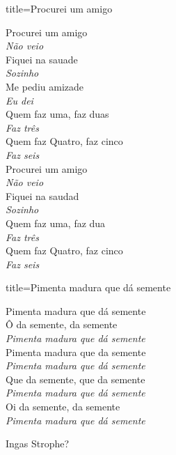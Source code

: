 \documentclass[fontsize=14pt, twoside]{scrreprt}
\begin{document}
\begin{multicols*}{2}
\begin{song}{title={Procurei um amigo }}
        \begin{verse*}
            Procurei um amigo\\
            \textit{Não veio}\\
            Fiquei na sauade\\
            \textit{Sozinho}\\
            Me pediu amizade\\
            \textit{Eu dei}\\
            Quem faz uma, faz duas\\
            \textit{Faz três}\\
            Quem faz Quatro, faz cinco\\
            \textit{Faz seis}\\
            Procurei um amigo\\
            \textit{Não veio}\\
            Fiquei na saudad\\
            \textit{Sozinho}\\
            Quem faz uma, faz dua\\
            \textit{Faz três}\\
            Quem faz Quatro, faz cinco\\
            \textit{Faz seis}\\
        \end{verse*}
\end{song}
\columnbreak
\begin{song}{title={Pimenta madura que dá semente}}
        \begin{verse*}
            Pimenta madura que dá semente\\
            Ô da semente, da semente\\
            \textit{Pimenta madura que dá semente}\\
            Pimenta madura que da semente\\
            \textit{Pimenta madura que dá semente}\\
            Que da semente, que da semente\\
            \textit{Pimenta madura que dá semente}\\
            Oi da semente, da semente\\
            \textit{Pimenta madura que dá semente}\\

        \end{verse*}
        \begin{verse*}
     Ingas Strophe?
        \end{verse*}
\end{song}



\end{multicols*}
\end{document}
